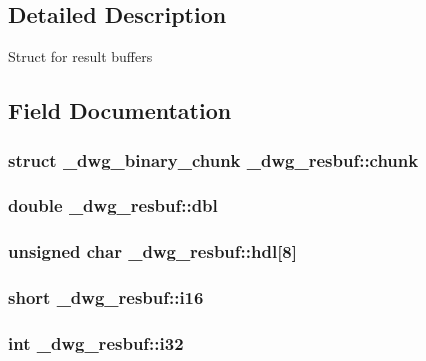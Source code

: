 \subsection{\-Detailed \-Description}
\-Struct for result buffers 

\subsection{\-Field \-Documentation}
\hypertarget{struct__dwg__resbuf_ac17eeacf7a7d393be6d599d6a5eefff6}{
\subsubsection[{chunk}]{\setlength{\rightskip}{0pt plus 5cm}struct {\bf \-\_\-dwg\-\_\-binary\-\_\-chunk} {\bf \-\_\-dwg\-\_\-resbuf\-::chunk}}}\label{struct__dwg__resbuf_ac17eeacf7a7d393be6d599d6a5eefff6}
\hypertarget{struct__dwg__resbuf_a901b9c0430be50c8428813f9980bfedf}{
\subsubsection[{dbl}]{\setlength{\rightskip}{0pt plus 5cm}double {\bf \-\_\-dwg\-\_\-resbuf\-::dbl}}}\label{struct__dwg__resbuf_a901b9c0430be50c8428813f9980bfedf}
\hypertarget{struct__dwg__resbuf_a52d96254caa6fb86b4ddee5c8199a130}{
\subsubsection[{hdl}]{\setlength{\rightskip}{0pt plus 5cm}unsigned char {\bf \-\_\-dwg\-\_\-resbuf\-::hdl}\mbox{[}8\mbox{]}}}\label{struct__dwg__resbuf_a52d96254caa6fb86b4ddee5c8199a130}
\hypertarget{struct__dwg__resbuf_a01dd0998f1365f76a8bc1989a8b39737}{
\subsubsection[{i16}]{\setlength{\rightskip}{0pt plus 5cm}short {\bf \-\_\-dwg\-\_\-resbuf\-::i16}}}\label{struct__dwg__resbuf_a01dd0998f1365f76a8bc1989a8b39737}
\hypertarget{struct__dwg__resbuf_a191ea9a7101073366ec7d1ef849956d5}{
\subsubsection[{i32}]{\setlength{\rightskip}{0pt plus 5cm}int {\bf \-\_\-dwg\-\_\-resbuf\-::i32}}}\label{struct__dwg__resbuf_a191ea9a7101073366ec7d1ef849956d5}
